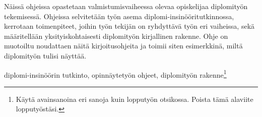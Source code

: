 \begin{tiivistelma}

Näissä ohjeissa opastetaan valmistumisvaiheessa olevaa opiskelijaa diplomityön tekemisessä. Ohjeissa selvitetään työn asema diplomi-insinööritutkinnossa, kerrotaan toimenpiteet, joihin työn tekijän on ryhdyttävä työn eri vaiheissa, sekä määritellään yksityiskohtaisesti diplomityön kirjallinen rakenne. Ohje on muotoiltu noudattaen näitä kirjoitusohjeita ja toimii siten esimerkkinä, miltä diplomityön tulisi näyttää.

\avainsanat diplomi-insinöörin tutkinto, opinnäytetyön ohjeet, diplomityön
rakenne\footnote{Käytä avainsanoina eri sanoja kuin lopputyön otsikossa. Poista tämä alaviite lopputyöstäsi.}


\end{tiivistelma}
